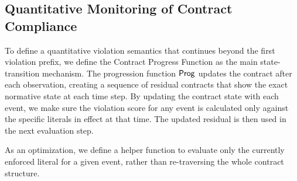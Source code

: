\subsection{Quantitative Monitoring of Contract Compliance}

To define a quantitative violation semantics that continues beyond the first violation prefix, we define the Contract Progress Function as the main state-transition mechanism. The progression function $\mathsf{Prog}$ updates the contract after each observation, creating a sequence of residual contracts that show the exact normative state at each time step. By updating the contract state with each event, we make sure the violation score for any event is calculated only against the specific literals in effect at that time. The updated residual is then used in the next evaluation step.



As an optimization, we define a helper function to evaluate only the currently enforced literal for a given event, rather than re-traversing the whole contract structure.



